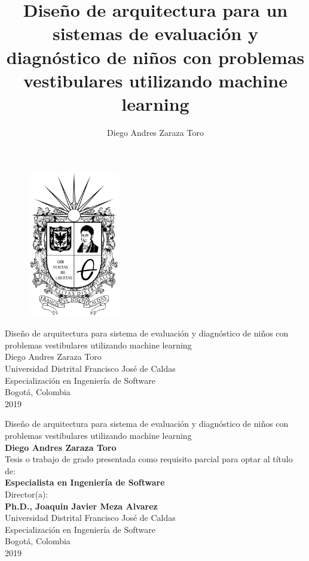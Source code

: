 \documentclass [12pt,letterpaper,oneside]{book}
\author {Diego Andres Zaraza Toro}
\title {Diseño de arquitectura para un sistemas de evaluación y diagnóstico de niños con problemas vestibulares utilizando machine learning}
\begin{document}
    \begin{center}
    	\thispagestyle{empty}
    	\vspace*{0cm}
        \begin{figure}
            \centering
            \includegraphics[width=4cm]{Imagenes/Figuras/00}
        \end{figure}
        \huge {Diseño de arquitectura para sistema de evaluación y diagnóstico de niños con problemas vestibulares utilizando machine learning}\\[3.5cm]
        \large{Diego Andres Zaraza Toro}\\[3.5cm]
        \large Universidad Distrital Francisco José de Caldas\\
        Especialización en Ingeniería de Software\\
        Bogotá, Colombia\\
        2019\\
    \end{center}
    \newpage
    \begin{center}
        \thispagestyle{empty}
        \vspace*{0cm}
        \large{Diseño de arquitectura para sistema de evaluación y diagnóstico de niños con problemas vestibulares utilizando machine learning}\\[3.5cm]
        \large\textbf{Diego Andres Zaraza Toro}\\[3.0cm]
        \small Tesis o trabajo de grado presentada como requisito parcial para optar al título de:\\
        \textbf{Especialista en Ingeniería de Software}\\[2.5cm]
        \small Director(a):\\
        \textbf{Ph.D., Joaquin Javier Meza Alvarez}\\[2.0cm]
        \large Universidad Distrital Francisco José de Caldas\\
        Especialización en Ingeniería de Software\\
        Bogotá, Colombia\\
        2019\\
    \end{center}
\end{document}
